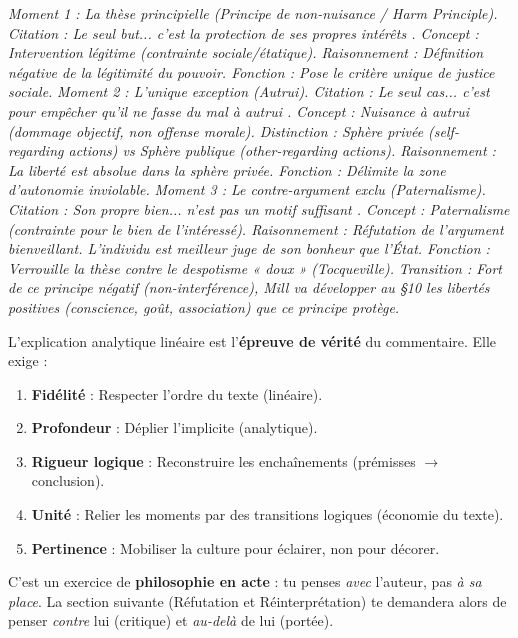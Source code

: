 \documentclass[11pt]{article}
\newcommand{\cle}[1]{{\popxbold\color{popdark}#1}}
\begin{document}
\begin{corrige}
\emph{Moment 1 : La thèse principielle (Principe de non-nuisance / \emph{Harm Principle}). Citation : \guillemotleft Le seul but... c'est la protection de ses propres intérêts \guillemotright. Concept : \cle{Intervention légitime} (contrainte sociale/étatique). Raisonnement : Définition négative de la légitimité du pouvoir. Fonction : Pose le critère unique de justice sociale.}
\emph{Moment 2 : L'unique exception (Autrui). Citation : \guillemotleft Le seul cas... c'est pour empêcher qu'il ne fasse du mal à autrui \guillemotright. Concept : \cle{Nuisance à autrui} (dommage objectif, non offense morale). Distinction : \cle{Sphère privée} (self-regarding actions) vs \cle{Sphère publique} (other-regarding actions). Raisonnement : La liberté est absolue dans la sphère privée. Fonction : Délimite la zone d'autonomie inviolable.}
\emph{Moment 3 : Le contre-argument exclu (Paternalisme). Citation : \guillemotleft Son propre bien... n'est pas un motif suffisant \guillemotright. Concept : \cle{Paternalisme} (contrainte pour le bien de l'intéressé). Raisonnement : Réfutation de l'argument bienveillant. L'individu est meilleur juge de son bonheur que l'État. Fonction : Verrouille la thèse contre le despotisme « doux » (Tocqueville).}
\emph{Transition : Fort de ce principe négatif (non-interférence), Mill va développer au §10 les libertés positives (conscience, goût, association) que ce principe protège.}
\end{corrige}

\begin{aretenir}
L'explication analytique linéaire est l'\textbf{épreuve de vérité} du commentaire. Elle exige :
\begin{enumerate}
    \item \textbf{Fidélité} : Respecter l'ordre du texte (linéaire).
    \item \textbf{Profondeur} : Déplier l'implicite (analytique).
    \item \textbf{Rigueur logique} : Reconstruire les enchaînements (prémisses $\rightarrow$ conclusion).
    \item \textbf{Unité} : Relier les moments par des transitions logiques (économie du texte).
    \item \textbf{Pertinence} : Mobiliser la culture pour éclairer, non pour décorer.
\end{enumerate}
C'est un exercice de \textbf{philosophie en acte} : tu penses \emph{avec} l'auteur, pas \emph{à sa place}. La section suivante (Réfutation et Réinterprétation) te demandera alors de penser \emph{contre} lui (critique) et \emph{au-delà} de lui (portée).
\end{aretenir}
\end{document}
